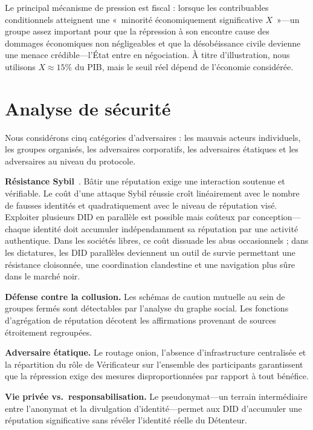 \documentclass[11pt,a4paper,twocolumn]{article}
\begin{document}
Le principal mécanisme de pression est fiscal : lorsque les contribuables conditionnels atteignent une «~minorité économiquement significative $X$~»---un groupe assez important pour que la répression à son encontre cause des dommages économiques non négligeables et que la désobéissance civile devienne une menace crédible---l'État entre en négociation. À titre d'illustration, nous utilisons $X \approx 15\%$ du PIB, mais le seuil réel dépend de l'économie considérée.

\section{Analyse de sécurité}

Nous considérons cinq catégories d'adversaires : les mauvais acteurs individuels, les groupes organisés, les adversaires corporatifs, les adversaires étatiques et les adversaires au niveau du protocole.

\textbf{Résistance Sybil}~\cite{douceur2002}. Bâtir une réputation exige une interaction soutenue et vérifiable. Le coût d'une attaque Sybil réussie croît linéairement avec le nombre de fausses identités et quadratiquement avec le niveau de réputation visé. Exploiter plusieurs DID en parallèle est possible mais coûteux par conception---chaque identité doit accumuler indépendamment sa réputation par une activité authentique. Dans les sociétés libres, ce coût dissuade les abus occasionnels ; dans les dictatures, les DID parallèles deviennent un outil de survie permettant une résistance cloisonnée, une coordination clandestine et une navigation plus sûre dans le marché noir.

\textbf{Défense contre la collusion.} Les schémas de caution mutuelle au sein de groupes fermés sont détectables par l'analyse du graphe social. Les fonctions d'agrégation de réputation décotent les affirmations provenant de sources étroitement regroupées.

\textbf{Adversaire étatique.} Le routage onion, l'absence d'infrastructure centralisée et la répartition du rôle de Vérificateur sur l'ensemble des participants garantissent que la répression exige des mesures disproportionnées par rapport à tout bénéfice.

\textbf{Vie privée vs.\ responsabilisation.} Le pseudonymat---un terrain intermédiaire entre l'anonymat et la divulgation d'identité---permet aux DID d'accumuler une réputation significative sans révéler l'identité réelle du Détenteur.
\end{document}
